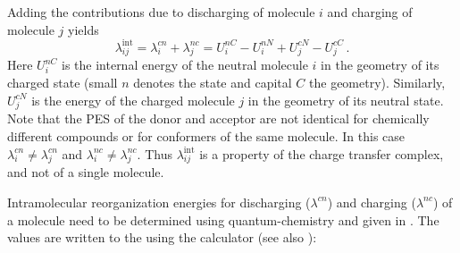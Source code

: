 Adding the contributions due to discharging of molecule $i$ and charging of molecule $j$ yields~\cite{bredas_charge-transfer_2004}
\begin{equation}
\lambda_{ij}^\text{int} =\lambda_{i}^{cn}+\lambda_{j}^{nc}=U_{i}^{nC}-U_{i}^{nN}+U_{j}^{cN}-U_{j}^{cC}\,.
\label{equ:lambdas}
\end{equation}
Here $U_{i}^{nC}$ is the internal energy of the neutral molecule $i$ in the geometry of its charged state (small $n$ denotes the state and capital $C$ the geometry). Similarly, $U_{j}^{cN}$ is the energy of the charged molecule $j$ in  the geometry of its neutral state.
%
Note that the PES of the donor and acceptor are not identical for chemically different compounds or for conformers of the same molecule. In this case $\lambda_{i}^{cn} \ne \lambda_{j}^{cn}$ and  $\lambda_{i}^{nc} \ne \lambda_{j}^{nc}$. Thus $\lambda_{ij}^\text{int}$ is a property of the charge transfer complex, and not of a single molecule.

Intramolecular reorganization energies for discharging ($\lambda^{cn}$) and charging ($\lambda^{nc}$) of a molecule need to be determined using quantum-chemistry and given in \xmlcsg. The values are written to the \sqlstate using the calculator  (see also ):

